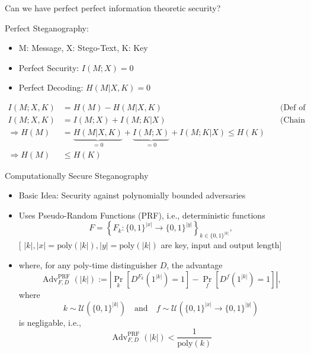 \documentclass[8pt]{beamer}
\begin{document}
\begin{frame}{Can we have perfect perfect information theoretic security?}


Perfect Steganography:
\begin{itemize}
    \item M: Message, X: Stego-Text, K: Key
    \item Perfect Security: $I(M;X) = 0$
    \item Perfect Decoding: $H(M| X, K) = 0$
\end{itemize}

\begin{align}
    I(M;X,K) &= H(M) - H(M|X,K) & \quad \text{(Def of Mut. Info)} \\
    I(M;X,K) &= I(M ; X) + I(M;K|X) & \quad \text{(Chain Rule)} \\
    \Rightarrow H(M) &= \underbrace{H(M|X,K)}_{=0} + \underbrace{I(M ; X)}_{=0} + I(M;K|X) \leq H(K) \\
    \Rightarrow H(M) &\leq H(K)
\end{align}
\end{frame}




\begin{frame}{Computationally Secure Steganography}

\begin{itemize}
    \item Basic Idea: Security against polynomially bounded adversaries
    \item Uses Pseudo-Random Functions (PRF), i.e., deterministic functions
\[
F=\left\{
F_k:\{0,1\}^{|x|}\to\{0,1\}^{|y|}
\right\}_{k\in\{0,1\}^{|k|}},
\]
[ $|k|, |x|=\text{poly}(|k|), |y|=\text{poly}(|k|)$ are key, input and output length]
\item where, for any poly-time distinguisher $D$, the advantage
\[
\operatorname{Adv}^{\mathrm{PRF}}_{F,D}(|k|)
:=
\left|
\Pr_{k}
\left[
D^{F_k}(1^{|k|})=1
\right]
-
\Pr_{f}
\left[
D^{f}(1^{|k|})=1
\right]
\right|,
\]
where
\[
    k\sim\mathcal{U}\left(\{0,1\}^{|k|}\right) \quad \text{and}\quad
    f\sim\mathcal{U}\left(\{0,1\}^{|x|}\to\{0,1\}^{|y|}\right)
\]
is negligable, i.e., 
\[
\operatorname{Adv}^{\mathrm{PRF}}_{F,D}(|k|) < \frac{1}{\text{poly}(k)}
\]
\end{itemize}


\end{frame}
\end{document}
